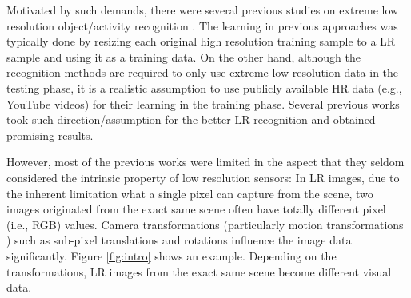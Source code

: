 \documentclass[letterpaper]{article} %
\begin{document}







Motivated by such demands, there were several previous studies on extreme low resolution object/activity recognition \cite{dai15,lrface16,ryoo17privacy,chen17,cheng17emotion}. The learning in previous approaches was typically done by resizing each original high resolution training sample to a LR sample and using it as a training data. On the other hand, although the recognition methods are required to only use extreme low resolution data in the testing phase, it is a realistic assumption to use publicly available HR data (e.g., YouTube videos) for their learning in the training phase. Several previous works took such direction/assumption \cite{lrface16,ryoo17privacy,chen17,cheng17emotion} for the better LR recognition and obtained promising results.

However, most of the previous works were limited in the aspect that they seldom considered the intrinsic property of low resolution sensors: In LR images, due to the inherent limitation what a single pixel can capture from the scene, two images originated from the exact same scene often have totally different pixel (i.e., RGB) values. Camera transformations (particularly motion transformations \cite{huang10}) such as sub-pixel translations and rotations influence the image data significantly. Figure \ref{fig:intro} shows an example. Depending on the transformations, LR images from the exact same scene become different visual data.
\end{document}

